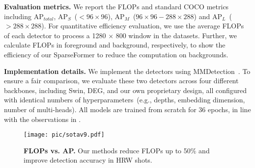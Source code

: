 \vspace{2mm}\noindent\textbf{Evaluation metrics.}  
We report the FLOPs and standard COCO metrics including AP$_{total}$, AP$_S$~($<96\times96$), AP$_{M}$~($96\times96-288\times288$) and AP$_{L}$~($>288\times288$).
For quantitative efficiency evaluation, we use the average FLOPs of each detector to process a 1280 $\times$ 800 window in the datasets.
Further, we calculate FLOPs in foreground and background, respectively, to show the efficiency of our SparseFormer to reduce the computation on backgrounds.

\vspace{2mm}\noindent\textbf{Implementation details.}
%
We implement the detectors using MMDetection~\cite{mmdetection}. To ensure a fair comparison, we evaluate these two detectors across four different backbones, including Swin, DEG, and our own proprietary design, all configured with identical numbers of hyperparameters~(e.g., depths, embedding dimension, number of multi-heads). All models are trained from scratch for 36 epochs, in line with the observations in \cite{he2019rethinking}.


\begin{figure}[!]
 \centering
		\texttt{[image: pic/sotav9.pdf]}
\vspace{-7pt}
	\caption{\textbf{FLOPs vs. AP.} Our methods reduce FLOPs up to 50\% and improve detection accuracy in HRW shots.}
	\label{fig:sota}	
\end{figure}


